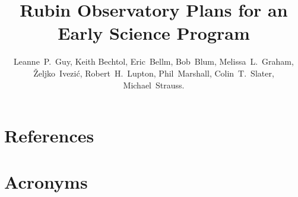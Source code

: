 \documentclass[DM,authoryear,lsstdraft,toc]{lsstdoc}
\title{Rubin Observatory Plans for an Early Science Program}
\author{%
Leanne~P.~Guy, Keith Bechtol, Eric~Bellm, Bob~Blum, Melissa~L.~Graham,
\v{Z}eljko~Ivezi\'{c}, Robert~H.~Lupton, Phil~Marshall, Colin~T.~Slater, Michael~Strauss.}
\date{\vcsDate}
\begin{document}
\maketitle

%









\appendix
\section{References} \label{sec:bib}
\renewcommand{\refname}{} %


\section{Acronyms} \label{sec:acronyms}

\end{document}

